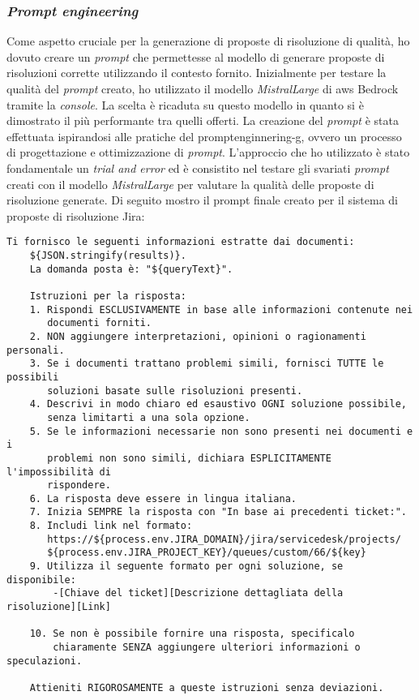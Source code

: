 \subsubsection{\textit{Prompt engineering}}
Come aspetto cruciale per la generazione di proposte di risoluzione di qualità, ho dovuto creare un \textit{prompt} che permettesse al modello di generare proposte di risoluzioni corrette utilizzando il contesto fornito. Inizialmente per testare la qualità del \textit{prompt} creato, ho utilizzato il modello \textit{MistralLarge} di \gls{aws} Bedrock tramite la \textit{console}. La scelta è ricaduta su questo modello in quanto si è dimostrato il più performante tra quelli offerti.
La creazione del \textit{prompt} è stata effettuata ispirandosi alle pratiche del \gls{promptenginnering-g}, ovvero un processo di progettazione e ottimizzazione di \textit{prompt}. L'approccio che ho utilizzato è stato fondamentale un \textit{trial and error} ed è consistito nel testare gli svariati \textit{prompt} creati con il modello \textit{MistralLarge} per valutare la qualità delle proposte di risoluzione generate.
Di seguito mostro il prompt finale creato per il sistema di proposte di risoluzione Jira:
\begin{Verbatim}[frame=single, fontsize=\small]
    Ti fornisco le seguenti informazioni estratte dai documenti:
    ${JSON.stringify(results)}.
    La domanda posta è: "${queryText}".
    
    Istruzioni per la risposta:
    1. Rispondi ESCLUSIVAMENTE in base alle informazioni contenute nei 
       documenti forniti.
    2. NON aggiungere interpretazioni, opinioni o ragionamenti personali.
    3. Se i documenti trattano problemi simili, fornisci TUTTE le possibili 
       soluzioni basate sulle risoluzioni presenti.
    4. Descrivi in modo chiaro ed esaustivo OGNI soluzione possibile, 
       senza limitarti a una sola opzione.
    5. Se le informazioni necessarie non sono presenti nei documenti e i 
       problemi non sono simili, dichiara ESPLICITAMENTE l'impossibilità di 
       rispondere.
    6. La risposta deve essere in lingua italiana.
    7. Inizia SEMPRE la risposta con "In base ai precedenti ticket:".
    8. Includi link nel formato:
       https://${process.env.JIRA_DOMAIN}/jira/servicedesk/projects/
       ${process.env.JIRA_PROJECT_KEY}/queues/custom/66/${key}
    9. Utilizza il seguente formato per ogni soluzione, se disponibile:
        -[Chiave del ticket][Descrizione dettagliata della risoluzione][Link]
    
    10. Se non è possibile fornire una risposta, specificalo 
        chiaramente SENZA aggiungere ulteriori informazioni o speculazioni.
    
    Attieniti RIGOROSAMENTE a queste istruzioni senza deviazioni.
\end{Verbatim}
